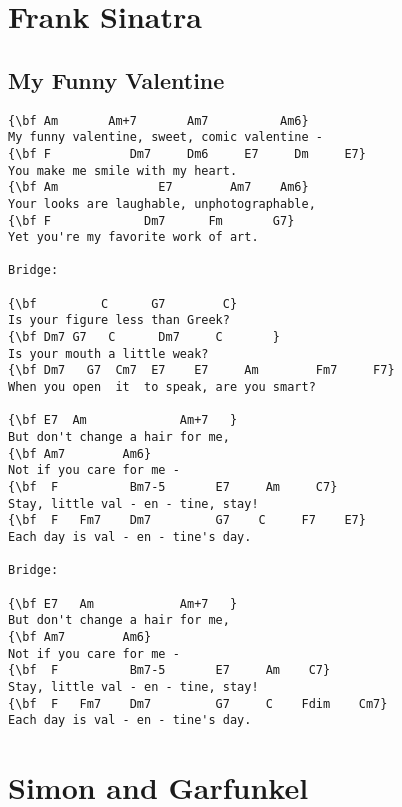 \documentclass[a4paper]{article}
\begin{document}
\section{Frank Sinatra} %
\label{sec:Frank Sinatr}
\subsection{My Funny Valentine} %
\label{sub:My Funny Valentine}
\begin{Verbatim}[commandchars=\\\{\}]
{\bf Am       Am+7       Am7          Am6}
My funny valentine, sweet, comic valentine -
{\bf F           Dm7     Dm6     E7     Dm     E7}
You make me smile with my heart.
{\bf Am              E7        Am7    Am6}
Your looks are laughable, unphotographable,
{\bf F             Dm7      Fm       G7}
Yet you're my favorite work of art.

Bridge:

{\bf         C      G7        C}
Is your figure less than Greek?
{\bf Dm7 G7   C      Dm7     C       }
Is your mouth a little weak?
{\bf Dm7   G7  Cm7  E7    E7     Am        Fm7     F7}
When you open  it  to speak, are you smart?

{\bf E7  Am             Am+7   }
But don't change a hair for me,
{\bf Am7        Am6}
Not if you care for me -
{\bf  F          Bm7-5       E7     Am     C7}
Stay, little val - en - tine, stay!
{\bf  F   Fm7    Dm7         G7    C     F7    E7}
Each day is val - en - tine's day.

Bridge:

{\bf E7   Am            Am+7   }
But don't change a hair for me,
{\bf Am7        Am6}
Not if you care for me -
{\bf  F          Bm7-5       E7     Am    C7}
Stay, little val - en - tine, stay!
{\bf  F   Fm7    Dm7         G7     C    Fdim    Cm7}
Each day is val - en - tine's day.
\end{Verbatim}
\newpage
\section{Simon and Garfunkel} %
\label{sec:Simon and Garfunkel}
\end{document}
